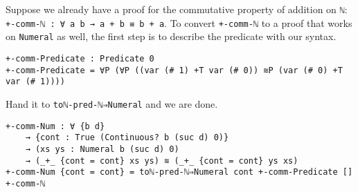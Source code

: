 \documentclass[\main/thesis.tex]{subfiles}
\begin{document}
Suppose we already have a proof for the commutative property of addition
on \lstinline|ℕ|: \lstinline|+-comm-ℕ : ∀ a b → a + b ≡ b + a|.
To convert \lstinline|+-comm-ℕ| to a proof that works on \lstinline|Numeral| as
well, the first step is to describe the predicate with our syntax.

\begin{lstlisting}[basicstyle=\ttfamily\scriptsize]
+-comm-Predicate : Predicate 0
+-comm-Predicate = ∀P (∀P ((var (# 1) +T var (# 0)) ≋P (var (# 0) +T var (# 1))))
\end{lstlisting}

Hand it to \lstinline|toℕ-pred-ℕ⇒Numeral| and we are done.

\begin{lstlisting}[basicstyle=\ttfamily\scriptsize]
+-comm-Num : ∀ {b d}
    → {cont : True (Continuous? b (suc d) 0)}
    → (xs ys : Numeral b (suc d) 0)
    → (_+_ {cont = cont} xs ys) ≋ (_+_ {cont = cont} ys xs)
+-comm-Num {cont = cont} = toℕ-pred-ℕ⇒Numeral cont +-comm-Predicate [] +-comm-ℕ
\end{lstlisting}
\end{document}
